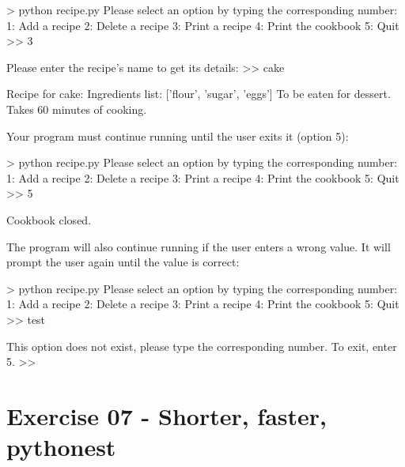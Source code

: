 \documentclass[]{article}
\newenvironment{Shaded}{\begin{snugshade}}{\end{snugshade}}
\newcommand{\NormalTok}[1]{\textcolor[rgb]{0.81,0.81,0.76}{#1}}
\begin{document}
\begin{Shaded}
\begin{Highlighting}[]
\NormalTok{> python recipe.py}
\NormalTok{Please select an option by typing the corresponding number:}
\NormalTok{1: Add a recipe}
\NormalTok{2: Delete a recipe}
\NormalTok{3: Print a recipe}
\NormalTok{4: Print the cookbook}
\NormalTok{5: Quit}
\NormalTok{>> 3}

\NormalTok{Please enter the recipe's name to get its details:}
\NormalTok{>> cake}

\NormalTok{Recipe for cake:}
\NormalTok{Ingredients list: ['flour', 'sugar', 'eggs']}
\NormalTok{To be eaten for dessert.}
\NormalTok{Takes 60 minutes of cooking.}
\end{Highlighting}
\end{Shaded}

Your program must continue running until the user exits it (option 5):

\begin{Shaded}
\begin{Highlighting}[]
\NormalTok{> python recipe.py}
\NormalTok{Please select an option by typing the corresponding number:}
\NormalTok{1: Add a recipe}
\NormalTok{2: Delete a recipe}
\NormalTok{3: Print a recipe}
\NormalTok{4: Print the cookbook}
\NormalTok{5: Quit}
\NormalTok{>> 5}

\NormalTok{Cookbook closed.}
\end{Highlighting}
\end{Shaded}

The program will also continue running if the user enters a wrong value.
It will prompt the user again until the value is correct:

\begin{Shaded}
\begin{Highlighting}[]
\NormalTok{> python recipe.py}
\NormalTok{Please select an option by typing the corresponding number:}
\NormalTok{1: Add a recipe}
\NormalTok{2: Delete a recipe}
\NormalTok{3: Print a recipe}
\NormalTok{4: Print the cookbook}
\NormalTok{5: Quit}
\NormalTok{>> test}

\NormalTok{This option does not exist, please type the corresponding number.}
\NormalTok{To exit, enter 5.}
\NormalTok{>> }
\end{Highlighting}
\end{Shaded}

\clearpage

\hypertarget{exercise-07---shorter-faster-pythonest-1}{%
\section{Exercise 07 - Shorter, faster,
pythonest}\label{exercise-07---shorter-faster-pythonest-1}}
\end{document}

